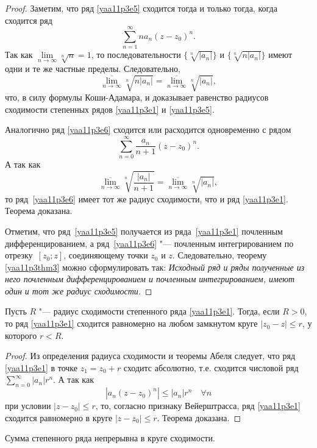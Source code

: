 \begin{proof}
Заметим, что ряд \eqref{yaa11p3e5} сходится тогда и только тогда, когда сходится ряд
$$
\sum\limits_{n=1}^{\infty}na_n(z-z_0)^n.
$$
Так как $\lim\limits_{n\to\infty} \sqrt[n]{n} = 1$, то последовательности $\{\sqrt[n]{|a_n|}\}$ и $\{\sqrt[n]{n|a_n|}\}$ имеют одни и те же частные пределы. Следовательно,
$$
\overline{\lim\limits_{n\to\infty}}\sqrt[n]{n|a_n|}=\overline{\lim\limits_{n\to\infty}}\sqrt[n]{|a_n|},
$$
что, в силу формулы Коши-Адамара, и доказывает равенство радиусов сходимости степенных рядов \eqref{yaa11p3e1} и \eqref{yaa11p3e5}.

Аналогично ряд \eqref{yaa11p3e6} сходится или расходится одновременно с рядом
$$
\sum\limits_{n=0}^{\infty}\frac{a_n}{n+1}(z-z_0)^n.
$$
А так как 
$$
\overline{\lim\limits_{n\to\infty}}\sqrt[n]{\frac{|a_n|}{n+1}}=\overline{\lim\limits_{n\to\infty}}\sqrt[n]{|a_n|},
$$
то ряд~\eqref{yaa11p3e6} имеет тот же радиус сходимости, что и ряд \eqref{yaa11p3e1}. Теорема доказана.

Отметим, что ряд~\eqref{yaa11p3e5} получается из ряда~\eqref{yaa11p3e1} почленным дифференцированием, а ряд~\eqref{yaa11p3e6} "--- почленным интегрированием по отрезку~$[z_0;z]$, соединяющему точки $z_0$ и $z$. Следовательно, теорему \eqref{yaa11p3thm3} можно сформулировать так:
\textit{Исходный ряд и ряды полученные из него почленным дифференцированием и почленным интегрированием, имеют один и тот же радиус сходимости.}
\end{proof}

\begin{thm}
Пусть $R$ "--- радиус сходимости степенного ряда \eqref{yaa11p3e1}. Тогда, если $R>0$, то ряд \eqref{yaa11p3e1} сходится равномерно на любом замкнутом круге $|z_0-z|\le r$, у которого $r<R$.
\end{thm}

\begin{proof}
Из определения радиуса сходимости и теоремы Абеля следует, что ряд \eqref{yaa11p3e1} в точке $z_1=z_0+r$ сходитс абсолютно, т.е. сходится числовой ряд $\sum\limits_{n=0}^{\infty} |a_n|r^n$. А так как
$$
|a_n(z-z_0)^n|\le |a_n|r^n \quad \forall n
$$
при условии $|z-z_0|\le r$, то, согласно признаку Вейерштрасса, ряд \eqref{yaa11p3e1} сходится равномерно в круге $|z-z_0|\le r$. Теорема доказана.
\end{proof}

\begin{cons}
Сумма степенного ряда непрерывна в круге сходимости.
\end{cons}

